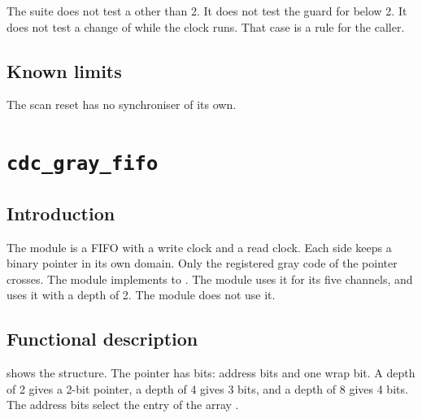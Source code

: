 The suite does not test a  other than 2. It does not test the guard for  below 2. It does not test a change of  while the clock runs. That case is a rule for the caller.

\subsection{Known limits}
The scan reset has no synchroniser of its own.

\section{\texttt{cdc\_gray\_fifo}}\label{tm:mod:cdc-gray-fifo}

\subsection{Introduction}
The module  is a FIFO with a write clock and a read clock. Each side keeps a binary pointer in its own domain. Only the registered gray code of the pointer crosses. The module implements  to . The module  uses it for its five channels, and  uses it with a depth of 2. The module  does not use it.

\subsection{Functional description}
 shows the structure. The pointer has  bits:  address bits and one wrap bit. A depth of 2 gives a 2-bit pointer, a depth of 4 gives 3 bits, and a depth of 8 gives 4 bits. The address bits select the entry of the array .

